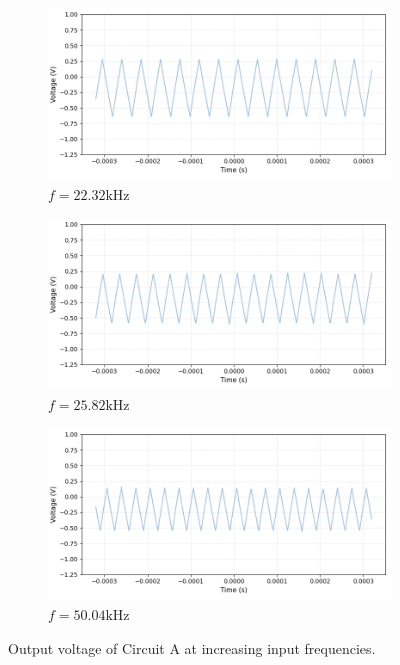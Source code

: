\documentclass{article}
\begin{document}
\begin{figure}[H]
    \begin{subfigure}[b]{0.45\linewidth}
        \includegraphics[width=\linewidth]{2.1.bc.png}
        \caption{$f = 22.32\si{\kilo\hertz}$}
    \end{subfigure}
    \hfill
    \begin{subfigure}[b]{0.45\linewidth}
        \includegraphics[width=\linewidth]{2.1.bd.png}
        \caption{$f = 25.82\si{\kilo\hertz}$}
    \end{subfigure}

    \begin{subfigure}[b]{0.45\linewidth}
        \includegraphics[width=\linewidth]{2.1.be.png}
        \caption{$f = 50.04\si{\kilo\hertz}$}
    \end{subfigure}

    \caption{Output voltage of Circuit A at increasing input frequencies.}
    \label{fig:integrator}
\end{figure}
\end{document}
